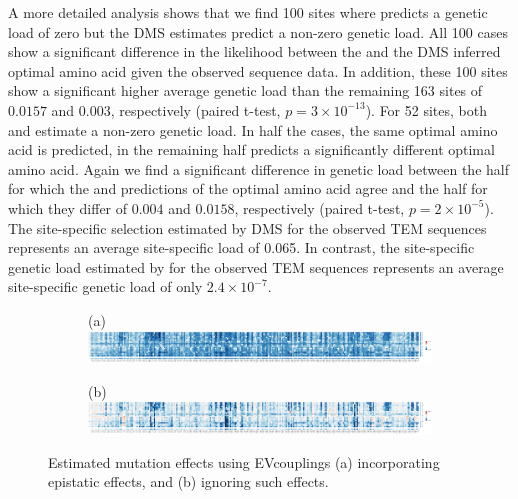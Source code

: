 \documentclass[fleqn,letterpaper]{article}
\begin{document}
A more detailed analysis shows that we find 100 sites where \selac predicts a genetic load of zero but the DMS estimates predict a non-zero genetic load.
All 100 cases show a significant difference in the likelihood between the \selac and the DMS inferred optimal amino acid given the observed sequence data.
In addition, these 100 sites show a significant higher average genetic load than the remaining 163 sites of $0.0157$ and $0.003$, respectively (paired t-test, $p = 3\times10^{-13}$).
For 52 sites, both \phydms and \selac estimate a non-zero genetic load.
In half the cases, the same optimal amino acid is predicted, in the remaining half \phydms predicts a significantly different optimal amino acid.
Again we find a significant difference in genetic load between the half for which the \selac and \phydms predictions of the optimal amino acid agree and the half for which they differ of $0.004$ and $0.0158$, respectively (paired t-test, $p = 2\times 10^{-5}$).
The site-specific selection estimated by DMS for the observed TEM sequences represents an average site-specific load of 0.065.
In contrast, the site-specific genetic load estimated by \selac for the observed TEM sequences represents an average site-specific genetic load of only $2.4\times 10^{-7}$.


\begin{figure}
    \centering
    \begin{subfigure}
        \centering
        (a)\includegraphics[width=\textwidth]{img/BLAT_ECOLX_b04_epistatic_model.pdf}
    \end{subfigure}
    \begin{subfigure}
        \centering
        (b)\includegraphics[width=\textwidth]{img/BLAT_ECOLX_b04_independent_model.pdf}
    \end{subfigure}
    \caption{Estimated mutation effects using EVcouplings (a) incorporating epistatic effects, and (b) ignoring such effects.}
    \label{fig:evcoupl}
\end{figure}
\end{document}
